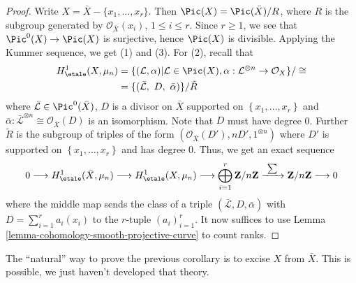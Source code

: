 \begin{proof}
Write $X = \bar X - \{ x_1, \ldots, x_r\}$. Then $\Pic(X) =
\Pic(\bar X)/ R$, where $R$ is the subgroup generated by
$\mathcal{O}_{\bar X}(x_i)$, $1 \leq i \leq r$. Since $r \geq 1$, we see that
$\Pic^0(X) \to \Pic(X)$ is surjective, hence $\Pic(X)$ is
divisible. Applying the Kummer sequence, we get (1) and (3). For (2), recall
that
\begin{align*}
H_\etale^1(X, \mu_n)
& =
\{(\mathcal L, \alpha) |
\mathcal L \in \Pic(X),
\alpha : \mathcal{L}^{\otimes n} \to \mathcal{O}_X\}/\cong \\
& =
\{(\bar{\mathcal L},\ D,\ \bar \alpha)\}/\tilde{R}
\end{align*}
where $\bar{\mathcal L} \in \Pic^0(\bar X)$, $D$ is a divisor on $\bar X$
supported on $\left\{x_1, \ldots, x_r\right\}$ and $ \bar{\alpha}:
\bar{\mathcal L}^{\otimes n} \cong \mathcal{O}_{\bar{X}}(D)$ is an isomorphism.
Note that $D$ must have degree 0. Further $\tilde{R}$ is the subgroup of
triples of the form $(\mathcal{O}_{\bar X}(D'), n D', 1^{\otimes n})$ where
$D'$ is supported on $\left\{x_1, \ldots, x_r\right\}$ and has degree 0. Thus,
we get an exact sequence
$$
0 \longrightarrow
H_\etale^1(\bar X, \mu_n) \longrightarrow
H_\etale^1(X, \mu_n) \longrightarrow
\bigoplus_{i = 1}^r \mathbf{Z}/n\mathbf{Z}
\xrightarrow{\ \sum\ }
\mathbf{Z}/n\mathbf{Z} \longrightarrow 0
$$
where the middle map sends the class of a triple $(\bar{ \mathcal L}, D, \bar
\alpha)$ with $D = \sum_{i = 1}^r a_i (x_i)$ to the $r$-tuple
$(a_i)_{i = 1}^r$. It now suffices to use
Lemma \ref{lemma-cohomology-smooth-projective-curve}
to count ranks.
\end{proof}

\begin{remark}
\label{remark-natural-proof}
The ``natural'' way to prove the previous corollary is to excise $X$ from $\bar
X$. This is possible, we just haven't developed that theory.
\end{remark}

